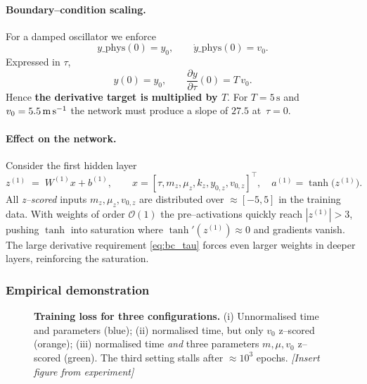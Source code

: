 \paragraph{Boundary–condition scaling.}
For a damped oscillator we enforce
\begin{equation}
    y\_{\text{phys}}(0)=y_0, 
    \qquad 
    \dot y\_{\text{phys}}(0)=v_0.
\end{equation}
Expressed in $\tau$,
\begin{equation}
 y(0)=y_0,
 \qquad
 \frac{\partial y}{\partial \tau}(0)=T\,v_0.
 \label{eq:bc_tau}
\end{equation}
Hence \textbf{the derivative target is multiplied by $T$}.  For
$T=5\,\text{s}$ and $v_0=5.5\,\text{m\,s}^{-1}$ the network must
produce a slope of $27.5$ at~$\tau=0$.

\paragraph{Effect on the network.}
Consider the first hidden layer
\begin{equation}
 z^{(1)} \;=\; W^{(1)}x + b^{(1)}, 
 \qquad 
 x=[\tau,m_z,\mu_z,k_z,y_{0,z},v_{0,z}]^\top,
 \quad 
 a^{(1)}=\tanh\!\bigl(z^{(1)}\bigr).
\end{equation}
All \emph{z–scored} inputs $m_z,\mu_z,v_{0,z}$ are
distributed over $\approx[-5,5]$ in the training data.
With weights of order $\mathcal O(1)$ the pre--activations quickly reach
$|z^{(1)}|>3$, pushing $\tanh$ into saturation where
$\tanh'(z^{(1)})\approx0$ and gradients vanish.
The large derivative requirement
\eqref{eq:bc_tau} forces even larger weights in deeper layers, reinforcing
the saturation.

\subsubsection{Empirical demonstration}

\begin{figure}[ht]
  \centering
  \caption{%
    \textbf{Training loss for three configurations.}
    (i) Unnormalised time and parameters (blue);
    (ii) normalised time, but only $v_0$ z–scored (orange); 
    (iii) normalised time \emph{and} three parameters
    $m,\mu,v_0$ z–scored (green).
    The third setting stalls after $\approx10^3$ epochs.
    \emph{[Insert figure from experiment]}}
  \label{fig:loss_norm_effect}
\end{figure}

